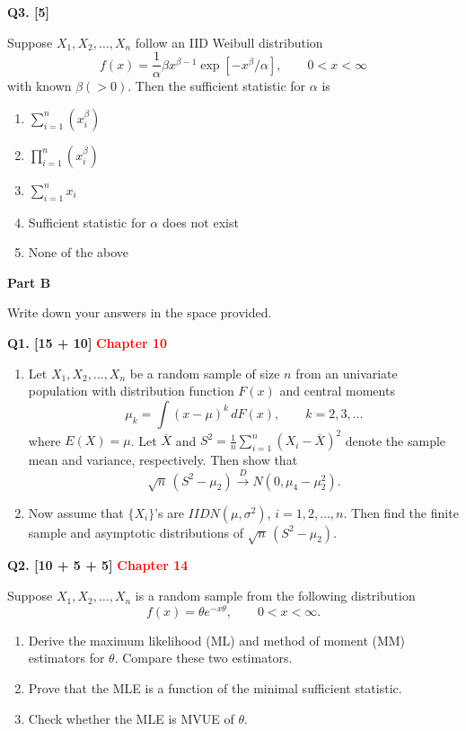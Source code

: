 \documentclass[11pt]{article}
\begin{document}
\bigskip

\textbf{Q3. [5]}

Suppose $X_1,X_2,\ldots,X_n$ follow an IID Weibull distribution
\[
f(x)=\frac{1}{\alpha}\beta x^{\beta-1}\exp[-x^{\beta}/\alpha],
\qquad 0<x<\infty
\]
with known $\beta(>0)$. Then the sufficient statistic for $\alpha$ is
\begin{enumerate}
\item[(a)] $\displaystyle\sum_{i=1}^{n}(x_i^{\beta})$
\item[(b)] $\displaystyle\prod_{i=1}^{n}(x_i^{\beta})$
\item[(c)] $\displaystyle\sum_{i=1}^{n}x_i$
\item[(d)] Sufficient statistic for $\alpha$ does not exist
\item[(e)] None of the above
\end{enumerate}

\bigskip

\begin{center}
\textbf{Part B}
\end{center}

Write down your answers in the space provided.

\textbf{Q1. [15 + 10]} \textbf{\textcolor{red}{Chapter 10}}

\begin{enumerate}
\item[(a)] Let $X_1,X_2,\ldots,X_n$ be a random sample of size $n$ from an univariate population with distribution function $F(x)$ and central moments
\[
\mu_k=\int (x-\mu)^k\,dF(x),\qquad k=2,3,\ldots
\]
where $E(X)=\mu$. Let $\overline X$ and $S^2=\frac1n\sum_{i=1}^{n}(X_i-\overline X)^2$ denote the sample mean and variance, respectively. Then show that
\[
\sqrt n\,(S^2-\mu_2)\xrightarrow{D}N(0,\mu_4-\mu_2^2).
\]

\item[(b)] Now assume that $\{X_i\}$'s are $IIDN(\mu,\sigma^2)$, $i=1,2,\ldots,n$. Then find the finite sample and asymptotic distributions of $\sqrt n\,(S^2-\mu_2)$.
\end{enumerate}

\bigskip

\textbf{Q2. [10 + 5 + 5]} \textbf{\textcolor{red}{Chapter 14}}

Suppose $X_1,X_2,\ldots,X_n$ is a random sample from the following distribution
\[
f(x)=\theta e^{-x\theta},\qquad 0<x<\infty.
\]
\begin{enumerate}
\item[(a)] Derive the maximum likelihood (ML) and method of moment (MM) estimators for $\theta$. Compare these two estimators.
\item[(b)] Prove that the MLE is a function of the minimal sufficient statistic.
\item[(c)] Check whether the MLE is MVUE of $\theta$.
\end{enumerate}
\end{document}
